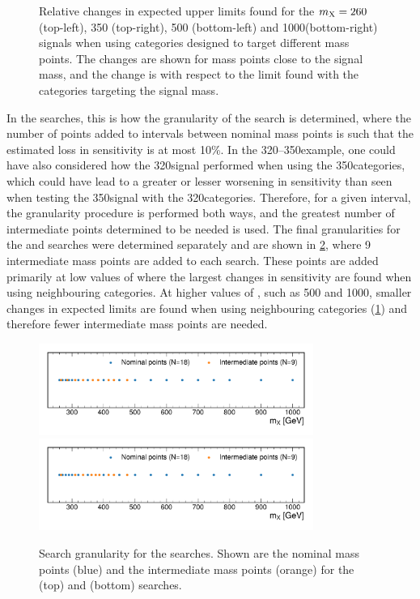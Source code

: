 \begin{figure}
  \caption[Relative Changes in Expected Upper Limits When Using Categories Not Designed for the Targeted Mass Point]{Relative changes in expected upper limits found for the $m_{\mathrm{X}}=260$ (top-left), 350 (top-right), 500 (bottom-left) and 1000\GeV (bottom-right) \XTwoHH signals when using categories designed to target different mass points. The changes are shown for mass points close to the signal mass, and the change is with respect to the limit found with the categories targeting the signal mass.}\label{fig:limit_granulaity_graviton_changes}
\end{figure}

In the \XHH searches, this is how the granularity of the search is determined, where the number of points added to intervals between nominal mass points is such that the estimated loss in sensitivity is at most 10\%. In the 320--350\GeV example, one could have also considered how the 320\GeV signal performed when using the 350\GeV categories, which could have lead to a greater or lesser worsening in sensitivity than seen when testing the 350\GeV signal with the 320\GeV categories. Therefore, for a given interval, the granularity procedure is performed both ways, and the greatest number of intermediate points determined to be needed is used. The final granularities for the \XZeroHH and \XTwoHH searches were determined separately and are shown in \cref{fig:granularity_xhh}, where 9 intermediate mass points are added to each search. These points are added primarily at low values of \mX where the largest changes in sensitivity are found when using neighbouring categories. At higher values of \mX, such as 500 and 1000\GeV, smaller changes in expected limits are found when using neighbouring categories (\cref{fig:limit_granulaity_graviton_changes}) and therefore fewer intermediate mass points are needed. 

\begin{figure}
  \centering
  \includegraphics[width=0.8\textwidth]{Figures/Dihiggs/results/LimitGranularity/mass_grid_Radion.pdf}
  \includegraphics[width=0.8\textwidth]{Figures/Dihiggs/results/LimitGranularity/mass_grid_Graviton.pdf}
  \caption[Search Granularity for the \XHH Searches]{Search granularity for the \XHH searches. Shown are the nominal mass points (blue) and the intermediate mass points (orange) for the \XZeroHH (top) and \XTwoHH (bottom) searches.}\label{fig:granularity_xhh}
\end{figure}

